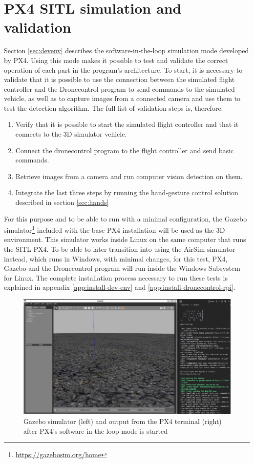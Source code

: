 \section{PX4 SITL simulation and validation}
\label{sec:test-2-sitl}

Section \ref{sec:devenv} describes the software-in-the-loop simulation mode developed by PX4.
Using this mode makes it possible to test and validate the correct operation of each part in the program's architecture.
To start, it is necessary to validate that it is possible to use the connection between the simulated flight controller and the Dronecontrol program to send commands to the simulated vehicle, as well as to capture images from a connected camera and use them to test the detection algorithm.
The full list of validation steps is, therefore:
\begin{enumerate}
    \item Verify that it is possible to start the simulated flight controller and that it connects to the 3D simulator vehicle.
    \item Connect the dronecontrol program to the flight controller and send basic commands.
    \item Retrieve images from a camera and run computer vision detection on them.
    \item Integrate the last three steps by running the hand-gesture control solution described in section \ref{sec:hands}
\end{enumerate}

For this purpose and to be able to run with a minimal configuration, the Gazebo simulator\footnote{\url{https://gazebosim.org/home}} included with the base PX4 installation will be used as the 3D environment.
This simulator works inside Linux on the same computer that runs the SITL PX4.
To be able to later transition into using the AirSim simulator instead, which runs in Windows, with minimal changes, for this test, PX4, Gazebo and the Dronecontrol program will run inside the Windows Subsystem for Linux.
The complete installation process necessary to run these tests is explained in appendix \ref{app:install-dev-env} and \ref{app:install-dronecontrol-rpi}.

\begin{figure}
  \centering
  \includegraphics[width=\textwidth, keepaspectratio]{img/gazebo.png}
  \caption{Gazebo simulator (left) and output from the PX4 terminal (right) after PX4's software-in-the-loop mode is started}\label{fig:gazebo}
\end{figure}


